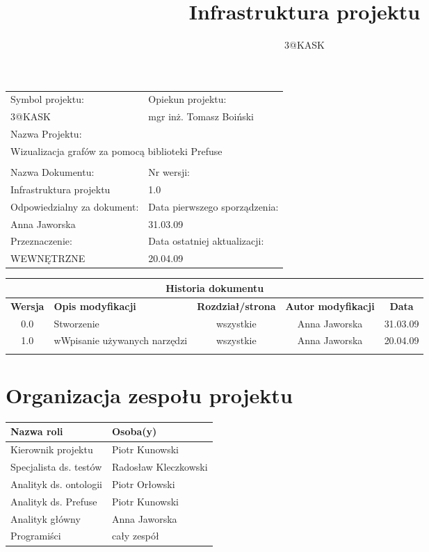 \documentclass[a4paper,10pt]{article}
\title{Infrastruktura projektu}
\author{3@KASK}
\begin{document}



\maketitle


\begin{center}
\begin{tabular}{|p{7cm}|p{7cm}|}
\hline
Symbol projektu: & Opiekun projektu:   \tabularnewline 
3@KASK & mgr inż. Tomasz Boiński    \tabularnewline \hline
\multicolumn{2}{|l|}{Nazwa Projektu: } \tabularnewline
\multicolumn{2}{|l|}{Wizualizacja grafów za pomocą biblioteki Prefuse } \tabularnewline 
\hline
\multicolumn{2}{l}{ } \tabularnewline %
\hline 
Nazwa Dokumentu: & Nr wersji:   \tabularnewline 
Infrastruktura projektu & 1.0 \tabularnewline \hline
Odpowiedzialny za dokument: & Data pierwszego sporządzenia:   \tabularnewline 
Anna Jaworska  & 31.03.09 \tabularnewline \hline
Przeznaczenie: & Data ostatniej aktualizacji:   \tabularnewline 
WEWNĘTRZNE & 20.04.09 \tabularnewline \hline
\end{tabular}
\end{center}

\begin{center}
\begin{tabular}{|c|p{4cm}|c|c|c|}
\multicolumn{5}{c}{\textbf{Historia dokumentu}} \tabularnewline \hline
\textbf{Wersja} & \textbf{Opis modyfikacji} & \textbf{Rozdział/strona} & \textbf{Autor modyfikacji} & \textbf{Data} \tabularnewline \hline 
0.0 & Stworzenie & wszystkie & Anna Jaworska & 31.03.09 \tabularnewline \hline
1.0 & wWpisanie używanych narzędzi & wszystkie & Anna Jaworska & 20.04.09 \tabularnewline \hline
& & & &\tabularnewline \hline
\end{tabular}
 

\end{center}


\newpage
\tableofcontents
\newpage

\section{Organizacja zespołu projektu}
\begin{center}
\begin{tabular}{|l|l|} \hline
	Nazwa roli & Osoba(y) \tabularnewline \hline
	Kierownik projektu & Piotr Kunowski \tabularnewline \hline
	Specjalista ds. testów & Radosław Kleczkowski \tabularnewline \hline
	Analityk ds. ontologii & Piotr Orłowski \tabularnewline \hline
	Analityk ds. Prefuse & Piotr Kunowski \tabularnewline \hline
	Analityk główny & Anna Jaworska \tabularnewline \hline
	Programiści & cały zespół \tabularnewline \hline
\end{tabular}
\end{center}
\end{document}
